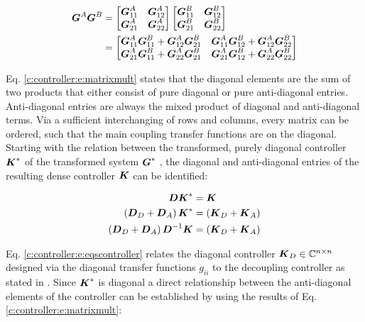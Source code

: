 \begin{align}
\begin{split}
\mbox{\boldmath$G$}^{A} \mbox{\boldmath$G$}^{B} &= 
\begin{bmatrix}
\mbox{\boldmath$G$}_{11}^{A} & \mbox{\boldmath$G$}_{12}^{A} \\
\mbox{\boldmath$G$}_{21}^{A} & \mbox{\boldmath$G$}_{22}^{A} 
\end{bmatrix}
\begin{bmatrix}
\mbox{\boldmath$G$}_{11}^{B} & \mbox{\boldmath$G$}_{12}^{B} \\
\mbox{\boldmath$G$}_{21}^{B} & \mbox{\boldmath$G$}_{22}^{B} 
\end{bmatrix}\\
&= \begin{bmatrix}
\mbox{\boldmath$G$}_{11}^{A}\mbox{\boldmath$G$}_{11}^{B} + \mbox{\boldmath$G$}_{12}^{A}\mbox{\boldmath$G$}_{21}^{B} & \mbox{\boldmath$G$}_{11}^{A}\mbox{\boldmath$G$}_{12}^{B} + \mbox{\boldmath$G$}_{12}^{A}\mbox{\boldmath$G$}_{22}^{B} \\
\mbox{\boldmath$G$}_{21}^{A}\mbox{\boldmath$G$}_{11}^{B} + \mbox{\boldmath$G$}_{22}^{A}\mbox{\boldmath$G$}_{21}^{B} &
\mbox{\boldmath$G$}_{21}^{A}\mbox{\boldmath$G$}_{12}^{B} + \mbox{\boldmath$G$}_{22}^{A}\mbox{\boldmath$G$}_{22}^{B}
\end{bmatrix}
\end{split}
\label{c:controller:e:matrixmult}
\end{align}

Eq. \ref{c:controller:e:matrixmult} states that the diagonal elements are the sum of two products that either consist of pure diagonal or pure anti-diagonal entries. Anti-diagonal entries are always the mixed product of diagonal and anti-diagonal terms. Via a sufficient interchanging of rows and columns, every matrix can be ordered, such that the main coupling transfer functions are on the diagonal.\\

Starting with the relation between the transformed, purely diagonal controller $\mbox{\boldmath$K$}^*$ of the transformed system $\mbox{\boldmath$G$}^*$ , the  diagonal and anti-diagonal entries of the resulting dense controller $\mbox{\boldmath$K$}$ can be identified:

\begin{align}
\begin{split}
\mbox{\boldmath$D$}\mbox{\boldmath$K$}^* &= \mbox{\boldmath$K$} \\
\left(\mbox{\boldmath$D$}_D + \mbox{\boldmath$D$}_A \right) \mbox{\boldmath$K$}^* &= \left(\mbox{\boldmath$K$}_D + \mbox{\boldmath$K$}_A \right)\\
\left(\mbox{\boldmath$D$}_D + \mbox{\boldmath$D$}_A \right) \mbox{\boldmath$D$}^{-1} \mbox{\boldmath$K$} &= \left(\mbox{\boldmath$K$}_D + \mbox{\boldmath$K$}_A \right)
\end{split}
\label{c:controller:e:eqscontroller}
\end{align}

Eq. \ref{c:controller:e:eqscontroller} relates the diagonal controller $\mbox{\boldmath$K$}_D \in \mathbb{C}^{n \times n}$ designed via the diagonal transfer functions $g_{ii}$ to the decoupling controller as stated in \cite{Astrom2001a} . Since $\mbox{\boldmath$K$}^{*}$ is diagonal a direct relationship between the anti-diagonal elements of the controller can be established by using the results of Eq.\ref{c:controller:e:matrixmult}:

